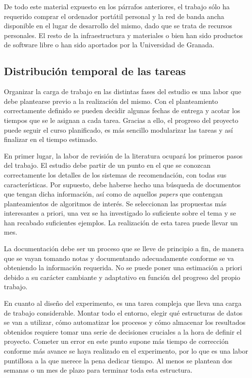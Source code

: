 De todo este material expuesto en los párrafos anteriores, el trabajo sólo ha requerido comprar el ordenador portátil personal y la red de banda ancha disponible en el lugar de desarrollo del mismo, dado que se trata de recursos personales. El resto de la infraestructura y materiales o bien han sido productos de software libre o han sido aportados por la Universidad de Granada.

\subsection{Distribución temporal de las tareas}

Organizar la carga de trabajo en las distintas fases del estudio es una labor que debe plantearse previo a la realización del mismo. Con el planteamiento correctamente definido se pueden decidir algunas fechas de entrega y acotar los tiempos que se le asignan a cada tarea. Gracias a ello, el progreso del proyecto puede seguir el curso planificado, es más sencillo modularizar las tareas y así finalizar en el tiempo estimado.

En primer lugar, la labor de revisión de la literatura ocupará los primeros pasos del trabajo. El estudio debe partir de un punto en el que se conozcan correctamente los detalles de los sistemas de recomendación, con todas sus características. Por supuesto, debe haberse hecho una búsqueda de documentos que tengan dicha información, así como de aquellos \textit{papers} que contengan planteamientos de algoritmos de interés. Se seleccionan las propuestas más interesantes a priori, una vez se ha investigado lo suficiente sobre el tema y se han recabado suficientes ejemplos. La realización de esta tarea puede llevar un mes.

La documentación debe ser un proceso que se lleve de principio a fin, de manera que se vayan tomando notas y documentando adecuadamente conforme se va obteniendo la información requerida. No se puede poner una estimación a priori debido a su carácter cambiante y adaptativo en función del progreso del propio trabajo.

En cuanto al diseño del experimento, es una tarea compleja que lleva una carga de trabajo considerable. Montar todo el entorno, elegir qué estructuras de datos se van a utilizar, cómo automatizar los procesos y cómo almacenar los resultados obtenidos requiere tomar una serie de decisiones cruciales a la hora de definir el proyecto. Cometer un error en este punto supone más tiempo de corrección conforme más avance se haya realizado en el experimento, por lo que es una labor puntillosa a la que merece la pena dedicar tiempo. Al menos se plantean dos semanas o un mes de plazo para terminar toda esta estructura.

